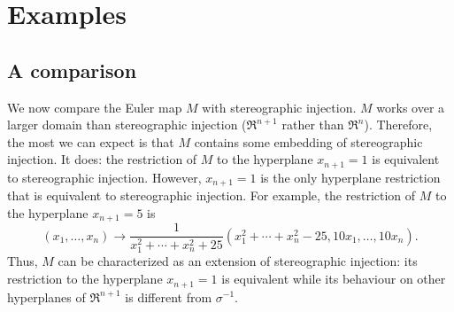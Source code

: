 \documentclass[11pt]{article}
\begin{document}

\clearpage

\section{Examples}

\subsection{A comparison}

We now compare the Euler map $M$ with stereographic injection.
$M$ works over a larger domain than stereographic injection ($\Re^{n+1}$
rather than $\Re^n$).
Therefore, the most we can expect is that $M$ contains some embedding of
stereographic injection.
It does: the restriction of $M$ to the hyperplane $x_{n+1}=1$
is equivalent to stereographic injection.
However, $x_{n+1}=1$ is the only hyperplane restriction that is equivalent to 
stereographic injection.
For example, the restriction of $M$ to the hyperplane $x_{n+1}=5$ is
\[
	(x_{1},\ldots,x_n) \rightarrow
	\frac{1}{x_1^2 + \cdots + x_n^2 + 25}
	(x_1^2 + \cdots + x_{n}^2 - 25, 10x_1, \ldots, 10x_n).
\]
Thus, $M$ can be characterized as an extension of stereographic injection:
its restriction to the hyperplane $x_{n+1}=1$ is equivalent
while its behaviour on other hyperplanes of $\Re^{n+1}$ is different
from $\sigma^{-1}$.
\end{document}
